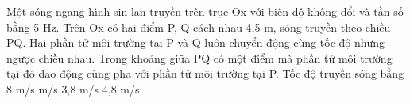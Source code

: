\begin{vidu}%
Một sóng ngang hình sin lan truyền trên trục Ox với biên độ không đổi và tần số bằng 5 Hz. Trên Ox có hai điểm P, Q cách nhau 4,5 m, sóng truyền theo chiều PQ. Hai phần tử môi trường tại P và Q luôn chuyển động cùng tốc độ nhưng ngược chiều nhau. Trong khoảng giữa PQ có một điểm mà phần tử môi trường tại đó dao động cùng pha với phần tử môi trường tại P. Tốc độ truyền sóng bằng
\choice
{8 m/s}
{ m/s}
{3,8 m/s}
{4,8 m/s}
\end{vidu} %






















